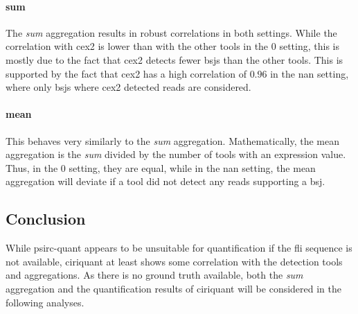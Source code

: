 \paragraph{sum}
The \textit{sum} aggregation results in robust correlations in both settings.
While the correlation with \gls{cex2} is lower than with the other tools in the
0 setting, this is mostly due to the fact that \gls{cex2} detects fewer
\glspl{bsj} than the other tools.
This is supported by the fact that \gls{cex2} has a high correlation of $0.96$ in
the \gls{nan} setting, where only \glspl{bsj} where \gls{cex2} detected reads
are considered.

\paragraph{mean}
This behaves very similarly to the \textit{sum} aggregation.
Mathematically, the mean aggregation is the \textit{sum} divided by the number of tools
with an expression value.
Thus, in the 0 setting, they are equal, while in the \gls{nan} setting, the
mean aggregation will deviate if a tool did not detect any reads supporting a
\gls{bsj}.

\subsection{Conclusion}

While \gls{psirc-quant} appears to be unsuitable for quantification if the
\gls{fli} sequence is not available, \gls{ciriquant} at least shows some
correlation with the detection tools and aggregations.
As there is no ground truth available, both the \textit{sum} aggregation and the
quantification results of \gls{ciriquant} will be considered in the following
analyses.
